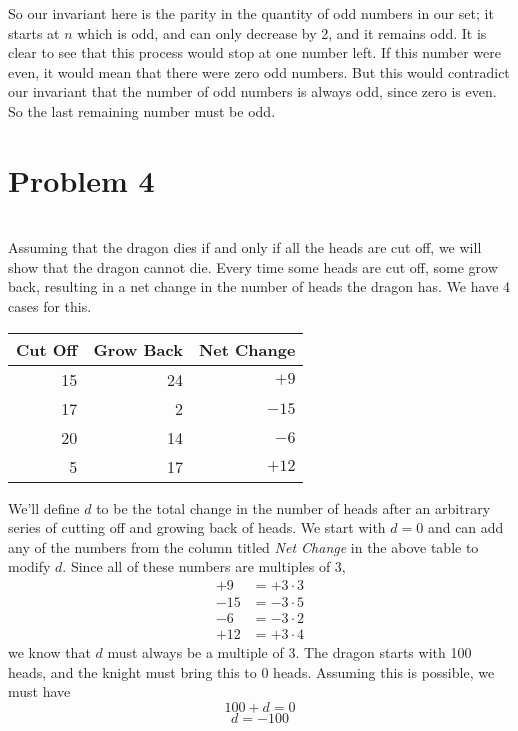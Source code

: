 \documentclass[12pt]{article}
\begin{document}
So our invariant here is the parity in the quantity of odd numbers in our set; it starts at $n$ which is odd, and can only decrease by 2, and it remains odd. It is clear to see that this process would stop at one number left. If this number were even, it would mean that there were zero odd numbers. But this would contradict our invariant that the number of odd numbers is always odd, since zero is even. So the last remaining number must be odd.

\section*{Problem 4}
\\

Assuming that the dragon dies if and only if all the heads are cut off, we will show that the dragon cannot die. Every time some heads are cut off, some grow back, resulting in a net change in the number of heads the dragon has. We have 4 cases for this.
\begin{center}
    \begin{tabular}{r r|r}
        Cut Off & Grow Back & Net Change\\
        \hline
        15 & 24 & $+9$\\
        17 & 2 & $-15$\\
        20 & 14 & $-6$\\
        5 & 17 & $+12$\\
    \end{tabular}
\end{center}

We'll define $d$ to be the total change in the number of heads after an arbitrary series of cutting off and growing back of heads. We start with $d=0$ and can add any of the numbers from the column titled \emph{Net Change} in the above table to modify $d$. Since all of these numbers are multiples of 3, 
\begin{align*}
    +9 &= +3\cdot3 \\
    -15 &= -3\cdot5 \\
    -6 &= -3\cdot2 \\
    +12 &= +3\cdot4
\end{align*}
we know that $d$ must always be a multiple of 3. The dragon starts with 100 heads, and the knight must bring this to 0 heads. Assuming this is possible, we must have
\[100 + d = 0\]
\[d = -100\]
\end{document}
